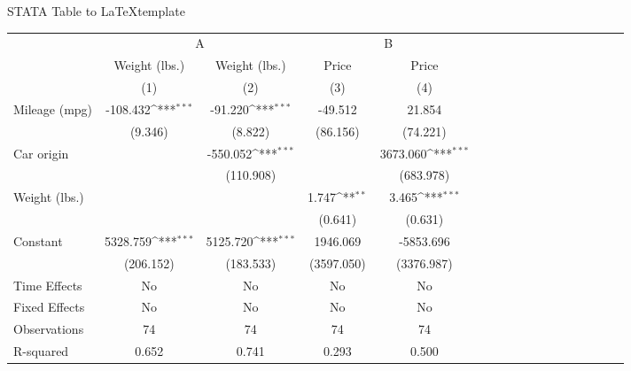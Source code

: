 \begin{frame}[fragile]{STATA Table to \LaTeX template}
\scriptsize
\centering
\def\sym#1{\ifmmode^{#1}\else\(^{#1}\)\fi}
\caption{A Standard Regression Table}
\begin{threeparttable}

\begin{tabular}{l*{4}{cccc}}
\toprule
                    &\multicolumn{2}{c}{A}                      &\multicolumn{2}{c}{B}                      \\\cmidrule(lr){2-3}\cmidrule(lr){4-5}
                    &\multicolumn{1}{c}{Weight (lbs.)}&\multicolumn{1}{c}{Weight (lbs.)}&\multicolumn{1}{c}{Price}&\multicolumn{1}{c}{Price}\\
                    &\multicolumn{1}{c}{(1)}&\multicolumn{1}{c}{(2)}&\multicolumn{1}{c}{(3)}&\multicolumn{1}{c}{(4)}\\
\midrule
Mileage (mpg)       &    -108.432\sym{***}&     -91.220\sym{***}&     -49.512         &      21.854         \\
                    &     (9.346)         &     (8.822)         &    (86.156)         &    (74.221)         \\
\addlinespace
Car origin          &                     &    -550.052\sym{***}&                     &    3673.060\sym{***}\\
                    &                     &   (110.908)         &                     &   (683.978)         \\
\addlinespace
Weight (lbs.)       &                     &                     &       1.747\sym{**} &       3.465\sym{***}\\
                    &                     &                     &     (0.641)         &     (0.631)         \\
\addlinespace
Constant            &    5328.759\sym{***}&    5125.720\sym{***}&    1946.069         &   -5853.696         \\
                    &   (206.152)         &   (183.533)         &  (3597.050)         &  (3376.987)         \\
\midrule
Time Effects        &          No         &          No         &          No         &          No         \\
Fixed Effects       &          No         &          No         &          No         &          No         \\
Observations        &          74         &          74         &          74         &          74         \\
R-squared           &       0.652         &       0.741         &       0.293         &       0.500         \\
\bottomrule
\end{tabular}


\end{threeparttable}
\end{frame}
